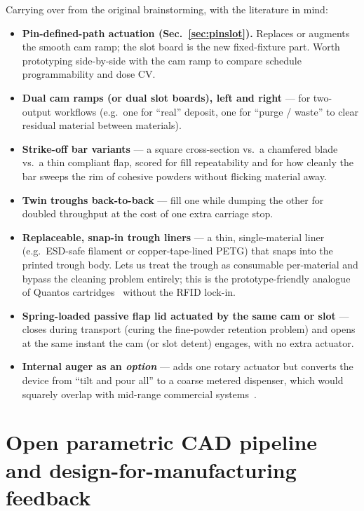 \documentclass[11pt,a4paper]{article}
\begin{document}
Carrying over from the original brainstorming, with the literature in mind:

\begin{itemize}[leftmargin=*]
  \item \textbf{Pin-defined-path actuation (Sec.~\ref{sec:pinslot}).}
    Replaces or augments the smooth cam ramp; the slot board is the new
    fixed-fixture part. Worth prototyping side-by-side with the cam ramp
    to compare schedule programmability and dose CV.
  \item \textbf{Dual cam ramps (or dual slot boards), left and right} ---
    for two-output workflows (e.g.\ one for ``real'' deposit, one for
    ``purge / waste'' to clear residual material between materials).
  \item \textbf{Strike-off bar variants} --- a square cross-section vs.\ a
    chamfered blade vs.\ a thin compliant flap, scored for fill
    repeatability and for how cleanly the bar sweeps the rim of cohesive
    powders without flicking material away.
  \item \textbf{Twin troughs back-to-back} --- fill one while dumping the
    other for doubled throughput at the cost of one extra carriage stop.
  \item \textbf{Replaceable, snap-in trough liners} --- a thin,
    single-material liner (e.g.\ ESD-safe filament or copper-tape-lined
    PETG) that snaps into the printed trough body. Lets us treat the
    trough as consumable per-material and bypass the cleaning problem
    entirely; this is the prototype-friendly analogue of Quantos
    cartridges~\cite{carruthers2025amobilerobotic} without the RFID
    lock-in.
  \item \textbf{Spring-loaded passive flap lid actuated by the same cam or
    slot} --- closes during transport (curing the fine-powder retention
    problem) and opens at the same instant the cam (or slot detent)
    engages, with no extra actuator.
  \item \textbf{Internal auger as an \emph{option}} --- adds one rotary
    actuator but converts the device from ``tilt and pour all'' to a
    coarse metered dispenser, which would squarely overlap with mid-range
    commercial systems~\cite{bahr2020recentadvancesin}.
\end{itemize}

\section{Open parametric CAD pipeline and design-for-manufacturing feedback}
\label{sec:cad-pipeline}
\end{document}
